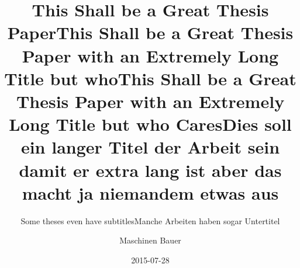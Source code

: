 \documentclass[online,a4paper,thesisdraft]{isw}
\title{This Shall be a Great Thesis Paper}
\title{This Shall be a Great Thesis Paper with an Extremely Long Title but who}
\title{This Shall be a Great Thesis Paper with an Extremely Long Title but who Cares}
\subtitle{Some theses even have subtitles}
\date{2015-07-28}
\author{Maschinen Bauer}
\begin{document}
    \frontmatter
    
    \maketitle
    
    \begin{otherlanguage}{ngerman}
        \title{Dies soll ein langer Titel der Arbeit sein damit er extra lang ist aber das macht ja niemandem etwas aus}
        \subtitle{Manche Arbeiten haben sogar Untertitel}
        \maketitle
    \end{otherlanguage}
    
    
    
    \begin{thesisabstract}
        \lipsum
    \end{thesisabstract}
    
    \begin{otherlanguage}{ngerman}
        \begin{thesisabstract}
            \lipsum
        \end{thesisabstract}
    \end{otherlanguage}
    
    \tableofcontents
    \listoffigures
    \listoftables
    
    
\end{document}
